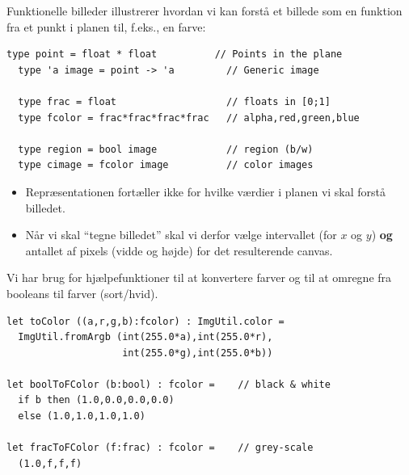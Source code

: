 \documentclass[rgb]{beamer}
\begin{document}
\begin{frame}[fragile]
\begin{footnotesize}


  Funktionelle billeder illustrerer hvordan vi kan forstå et billede
  som en funktion fra et punkt i planen til, f.eks., en farve:

  \vspace{1ex}

\begin{lstlisting}[numbers=none,frame=none,mathescape]
  type point = float * float          // Points in the plane
  type 'a image = point -> 'a         // Generic image

  type frac = float                   // floats in [0;1]
  type fcolor = frac*frac*frac*frac   // alpha,red,green,blue

  type region = bool image            // region (b/w)
  type cimage = fcolor image          // color images
\end{lstlisting}

\begin{itemize}
\item Repræsentationen fortæller ikke for hvilke værdier i planen vi skal forstå billedet.
\item Når vi skal ``tegne billedet'' skal vi derfor vælge intervallet
  (for $x$ og $y$) \textbf{og} antallet af pixels (vidde og højde) for
  det resulterende canvas.
\end{itemize}

\end{footnotesize}
\end{frame}

\begin{frame}[fragile]
\begin{footnotesize}


  \vspace{1ex}

  Vi har brug for hjælpefunktioner til at konvertere farver og til at
  omregne fra booleans til farver (sort/hvid).


\begin{lstlisting}[numbers=none,frame=none,mathescape]
let toColor ((a,r,g,b):fcolor) : ImgUtil.color =
  ImgUtil.fromArgb (int(255.0*a),int(255.0*r),
                    int(255.0*g),int(255.0*b))

let boolToFColor (b:bool) : fcolor =    // black & white
  if b then (1.0,0.0,0.0,0.0)
  else (1.0,1.0,1.0,1.0)

let fracToFColor (f:frac) : fcolor =    // grey-scale
  (1.0,f,f,f)
\end{lstlisting}

\end{footnotesize}
\end{frame}
\end{document}
